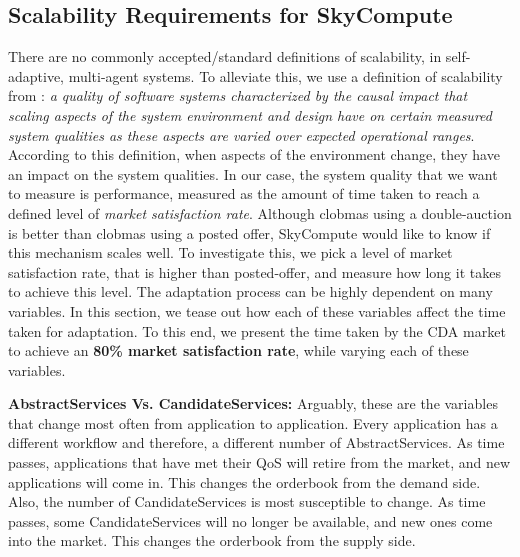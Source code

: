 \documentclass[10pt,journal,compsoc]{IEEEtran}
\begin{document}
\subsection{Scalability Requirements for SkyCompute} \label{scalability_testing}
There are no commonly accepted/standard definitions of scalability, in self-adaptive, multi-agent systems. To alleviate this, we use a definition of scalability from \cite{Duboc2007framework}: \textit{a quality of software systems characterized by the causal impact that scaling aspects of the system environment and design have on certain measured system qualities as these aspects are varied over expected operational ranges}.\\
According to this definition, when aspects of the environment change, they have an impact on the system qualities. In our case, the system quality that we want to measure is performance, measured as the amount of time taken to reach a defined level of \textit{market satisfaction rate}. Although clobmas using a double-auction is better than clobmas using a posted offer, SkyCompute would like to know if this mechanism scales well. To investigate this, we pick a level of market satisfaction rate, that is higher than posted-offer, and measure how long it takes to achieve this level. The adaptation process can be highly dependent on many variables. In this section, we tease out how each of these variables affect the time taken for adaptation. To this end, we present the time taken by the CDA market to achieve an \textbf{80\%  market satisfaction rate}, while varying each of these variables.

\textbf{AbstractServices Vs. CandidateServices:}
Arguably, these are the variables that change most often from application to application. Every application has a different workflow and therefore, a different number of AbstractServices. As time passes, applications that have met their QoS will retire from the market, and new applications will come in. This changes the orderbook from the demand side. Also, the number of CandidateServices is most susceptible to change. As time passes, some CandidateServices will no longer be available, and new ones come into the market. This changes the orderbook from the supply side.
\end{document}
